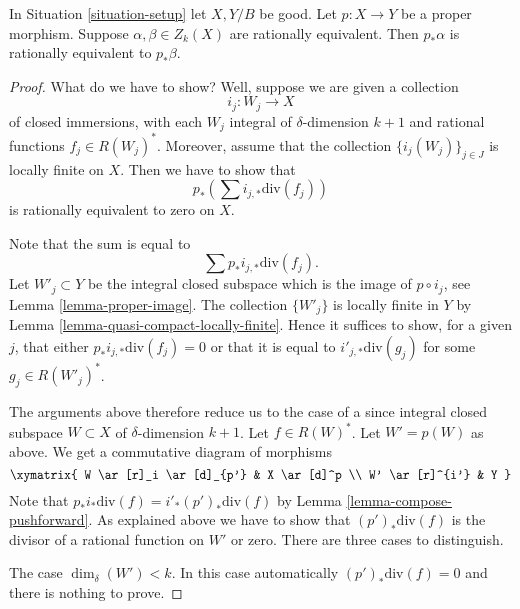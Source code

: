 \begin{lemma}
\label{lemma-proper-pushforward-rational-equivalence}
In Situation \ref{situation-setup} let $X, Y/B$ be good.
Let $p : X \to Y$ be a proper morphism.
Suppose $\alpha, \beta \in Z_k(X)$ are rationally equivalent.
Then $p_*\alpha$ is rationally equivalent to $p_*\beta$.
\end{lemma}

\begin{proof}
What do we have to show? Well, suppose we are given a collection
$$
i_j : W_j \longrightarrow X
$$
of closed immersions, with each $W_j$ integral of $\delta$-dimension $k + 1$
and rational functions $f_j \in R(W_j)^*$.
Moreover, assume that
the collection $\{i_j(W_j)\}_{j \in J}$ is locally finite on $X$.
Then we have to show that
$$
p_*\left(\sum i_{j, *}\text{div}(f_j)\right)
$$
is rationally equivalent to zero on $X$.

\medskip\noindent
Note that the sum is equal to
$$
\sum p_*i_{j, *}\text{div}(f_j).
$$
Let $W'_j \subset Y$ be the integral closed subspace which is the
image of $p \circ i_j$, see Lemma \ref{lemma-proper-image}.
The collection $\{W'_j\}$ is locally finite
in $Y$ by Lemma \ref{lemma-quasi-compact-locally-finite}.
Hence it suffices to show, for a given $j$, that either
$p_*i_{j, *}\text{div}(f_j) = 0$ or that it
is equal to $i'_{j, *}\text{div}(g_j)$ for some $g_j \in R(W'_j)^*$.

\medskip\noindent
The arguments above therefore reduce us to the case of a since
integral closed subspace $W \subset X$ of $\delta$-dimension $k + 1$.
Let $f \in R(W)^*$. Let $W' = p(W)$ as above.
We get a commutative diagram of morphisms
$$
\xymatrix{
W \ar[r]_i \ar[d]_{p'} & X \ar[d]^p \\
W' \ar[r]^{i'} & Y
}
$$
Note that $p_*i_*\text{div}(f) = i'_*(p')_*\text{div}(f)$ by
Lemma \ref{lemma-compose-pushforward}. As explained above
we have to show that $(p')_*\text{div}(f)$
is the divisor of a rational function on $W'$ or zero.
There are three cases to distinguish.

\medskip\noindent
The case $\dim_\delta(W') < k$. In this case automatically
$(p')_*\text{div}(f) = 0$ and there is nothing to prove.


\end{proof}
